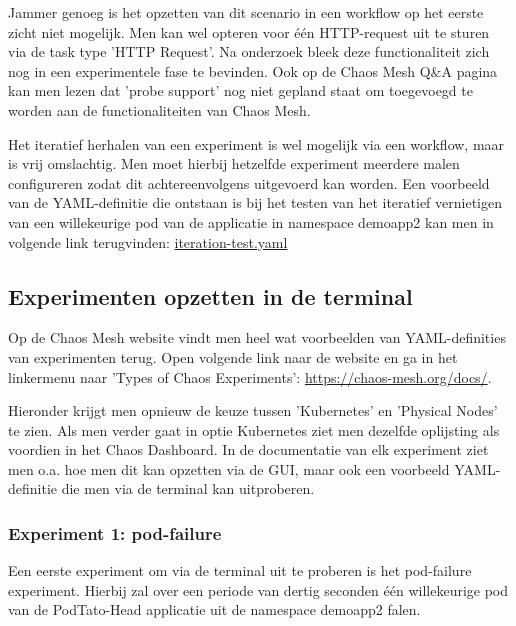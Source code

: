 Jammer genoeg is het opzetten van dit scenario in een workflow op het eerste zicht niet mogelijk. Men kan wel opteren voor één HTTP-request uit te sturen via de task type 'HTTP Request'. Na onderzoek bleek deze functionaliteit zich nog in een experimentele fase te bevinden. \autocite{ChaosMesh2022c}  
\newline Ook op de Chaos Mesh Q\&A pagina kan men lezen dat 'probe support' nog niet gepland staat om toegevoegd te worden aan de functionaliteiten van Chaos Mesh. \autocite{ChaosMesh2021}

Het iteratief herhalen van een experiment is wel mogelijk via een workflow, maar is vrij omslachtig. Men moet hierbij hetzelfde experiment meerdere malen configureren zodat dit achtereenvolgens uitgevoerd kan worden. Een voorbeeld van de YAML-definitie die ontstaan is bij het testen van het iteratief vernietigen van een willekeurige pod van de applicatie in namespace demoapp2 kan men in volgende link terugvinden: \href{https://github.com/KenBruggeman/BP\textunderscore 21-22/blob/master/bachelorproef/docs/chaosmesh%20experimenten/iteration-test.yaml}{iteration-test.yaml}

\subsection{Experimenten opzetten in de terminal}

Op de Chaos Mesh website vindt men heel wat voorbeelden van YAML-definities van experimenten terug. Open volgende link naar de website en ga in het linkermenu naar 'Types of Chaos Experiments': \url{https://chaos-mesh.org/docs/}.

Hieronder krijgt men opnieuw de keuze tussen 'Kubernetes' en 'Physical Nodes' te zien. Als men verder gaat in optie Kubernetes ziet men dezelfde oplijsting als voordien in het Chaos Dashboard. In de documentatie van elk experiment ziet men o.a. hoe men dit kan opzetten via de GUI, maar ook een voorbeeld YAML-definitie die men via de terminal kan uitproberen.

\subsubsection{Experiment 1: pod-failure}

Een eerste experiment om via de terminal uit te proberen is het pod-failure experiment. Hierbij zal over een periode van dertig seconden één willekeurige pod van de PodTato-Head applicatie uit de namespace demoapp2 falen. 

